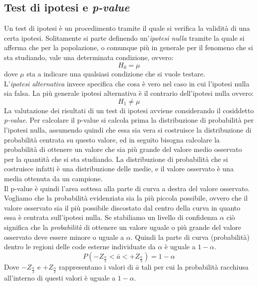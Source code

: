 \subsection{Test di ipotesi e \textit{p-value}}
Un test di ipotesi è un procedimento tramite il quale si verifica la validità di una certa ipotesi. Solitamente si parte definendo un'\textit{ipotesi nulla} tramite la quale si afferma che per la popolazione, o comunque più in generale per il fenomeno che si sta studiando, vale una determinata condizione, ovvero:
\begin{equation}
H_0 = \mu 
\end{equation}
dove $\mu$ sta a indicare una qualsiasi condizione che si vuole testare. \\
L'\textit{ipotesi alternativa} invece specifica che cosa è vero nel caso in cui l'ipotesi nulla sia falsa. La più generale ipotesi alternativa è il contrario dell'ipotesi nulla ovvero:
\begin{equation}
H_1 \neq \mu 
\end{equation}
La valutazione dei risultati di un test di ipotesi avviene considerando il cosiddetto \textit{p-value}. Per calcolare il p-value si calcola prima la distribuzione di probabilità per l'ipotesi nulla, assumendo quindi che essa sia vera si costruisce la distribuzione di probabilità centrata su questo valore, ed in seguito bisogna calcolare la probabilità di ottenere un valore che sia più grande del valore medio osservato per la quantità che si sta studiando. La distribuzione di probabilità che si costruisce infatti è una distribuzione delle  medie, e il valore osservato è una media ottenuta da un campione.\\ 
Il p-value è quindi l'area sottesa alla parte di curva a destra del valore osservato.
Vogliamo che la probabilità evidenziata sia la più piccola possibile, ovvero che il valore osservato sia il più possibile discostato dal centro della curva in quanto essa è centrata sull'ipotesi nulla. Se stabiliamo un livello di confidenza $\alpha$ ciò significa che la \textit{probabilità} di ottenere un valore uguale o più grande del valore osservato deve essere minore o uguale a $\alpha$. Quindi la parte di curva (probabilità) dentro le regioni delle code esterne individuate da $\alpha$ è uguale a $1-\alpha$.
\begin{equation}
P(-Z_{\frac{\alpha}{2}}< \bar{a} < +Z_{\frac{\alpha}{2}}) = 1 - \alpha
\end{equation}
Dove $-Z_{\frac{\alpha}{2}}$ e $+Z_{\frac{\alpha}{2}}$ rappresentano i valori di $\bar{a}$ tali per cui la probabilità racchiusa all'interno di questi valori è uguale a $1-\alpha$. 
